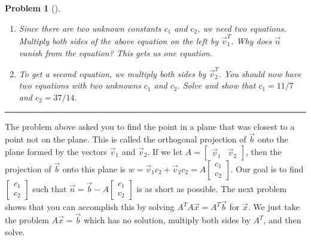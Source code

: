 \documentclass[letterpaper,oneside]{book}%
\theoremstyle{plain}
\theoremstyle{box}
\theoremstyle{problem}
\newtheorem{problemnum}{Problem}[chapter]
\newenvironment{problem}[1][]{\begin{problemnum}[#1]}{\end{problemnum}\nopagebreak\hrule\bigskip}
\newcommand{\bvec}[1]{\begin{bmatrix} #1 \end{bmatrix}}
\begin{document}
\begin{problem}
\begin{enumerate}
\begin{center}
\begin{tikzpicture}[scale=1]
\end{tikzpicture}
\end{center}
 When Jimmy has arrived at the closest spot to the ship, he'll have the smallest $\vec n$ so that $$\vec v_1 c_1+\vec v_2 c_2+\vec n=\vec b\quad\quad\text{ or }\quad \quad \vec w+\vec n=\vec b.$$ Why must $\vec v_1^T\vec n=0$ and $\vec v_2^T\vec n=0$?  
 \item 
 Since there are two unknown constants $c_1$ and $c_2$, we need two equations.  Multiply both sides of the above equation on the left by $\vec v_1^T$. Why does $\vec n$ vanish from the equation? This gets us one equation.
 \item 
 To get a second equation, we multiply both sides by $\vec v_2^T$. You should now have two equations with two unknowns $c_1$ and $c_2$. Solve and show that $c_1 = 11/7$ and $c_2=37/14$.
\end{enumerate}

\end{problem}

The problem above asked you to find the point in a plane that was closest to a point not on the plane.  This is called the orthogonal projection of $\vec b$ onto the plane formed by the vectors $\vec v_1$ and $\vec v_2$.  If we let $A=\bvec{\vec v_1&\vec v_2}$, then the projection of $\vec b$ onto this plane is $w=\vec v_1c_2+\vec v_2c_2=A\bvec{c_1\\c_2}$. Our goal is to find $\bvec{c_1\\c_2}$ such that $\vec n=\vec b-A\bvec{c_1\\c_2}$ is as short as possible. The next problem shows that you can accomplish this by solving $A^TA\vec x=A^T\vec b$ for $\vec x$. We just take the problem $A\vec x=\vec b$ which has no solution, multiply both sides by $A^T$, and then solve.  
\end{document}
